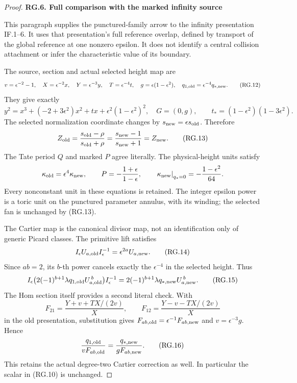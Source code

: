\begin{proof}
\par

\medskip\noindent\textbf{RG.6. Full comparison with the marked infinity source}

\par\nobreak

This paragraph supplies the punctured-family arrow to the infinity
presentation IF.1--6. It uses that presentation's full reference
overlap, defined by transport of the global reference at one
nonzero epsilon. It does not identify a central collision attachment
or infer the characteristic value of its boundary.

The source, section and actual selected height map are
\[
 v=\epsilon^{-2}-1,\quad
 X=\epsilon^{-2}x,\quad Y=\epsilon^{-3}y,\quad
 T=\epsilon^{-4}t,\quad
 g=\epsilon(1-\epsilon^2),\quad
 q_{1,\rm old}=\epsilon^{-4}q_{*,\rm new}.
                                                        \tag{RG.12}
\]
They give exactly
\[
 y^2=x^3+(-2+3\epsilon^2)x^2+tx+
              \epsilon^2(1-\epsilon^2)^2,\quad G=(0,g),
\qquad
 t_*=(1-\epsilon^2)(1-3\epsilon^2).
\]
The selected normalization coordinate changes by
\(s_{\rm new}=\epsilon s_{\rm old}\). Therefore
\[
 Z_{\rm old}=\frac{s_{\rm old}-\rho}{s_{\rm old}+\rho}
            =\frac{s_{\rm new}-1}{s_{\rm new}+1}
            =Z_{\rm new}.
                                                        \tag{RG.13}
\]
The Tate period \(Q\) and marked \(P\) agree literally.
The physical-height units satisfy
\[
 \kappa_{\rm old}=\epsilon^4\kappa_{\rm new},\qquad
 P=-\frac{1+\epsilon}{1-\epsilon},\qquad
 \left.\kappa_{\rm new}\right|_{q_*=0}
                       =-\frac{1-\epsilon^2}{64}.
\]
Every nonconstant unit in these equations is retained. The
integer epsilon power is a toric unit on the punctured parameter
annulus, with its winding; the selected fan is unchanged by
(RG.13).

The Cartier map is the canonical divisor map, not an identification
only of generic Picard classes. The primitive lift satisfies
\[
 I_\epsilon U_{a,\rm old}I_\epsilon^{-1}
                  =\epsilon^{2a}U_{a,\rm new}.
                                                        \tag{RG.14}
\]
Since \(ab=2\), its \(b\)-th power cancels exactly the
\(\epsilon^{-4}\) in the selected height. Thus
\[
 I_\epsilon\bigl(2(-1)^{b+1}\lambda
             q_{1,\rm old}U_{a,\rm old}^{\,b}\bigr)
 I_\epsilon^{-1}
       =2(-1)^{b+1}\lambda q_{*,\rm new}U_{a,\rm new}^{\,b}.
                                                        \tag{RG.15}
\]
The Hom section itself provides a second literal check. With
\[
 F_{21}=\frac{Y+v+TX/(2v)}X,\qquad
 F_{12}=\frac{Y-v-TX/(2v)}X
\]
in the old presentation, substitution gives
\(F_{ab,\rm old}=\epsilon^{-1}F_{ab,\rm new}\) and
\(v=\epsilon^{-3}g\). Hence
\[
       \frac{q_{1,\rm old}}{vF_{ab,\rm old}}
               =\frac{q_{*,\rm new}}{gF_{ab,\rm new}}. \tag{RG.16}
\]
This retains the actual degree-two Cartier correction as well.
In particular the scalar in (RG.10) is unchanged.


\end{proof}
